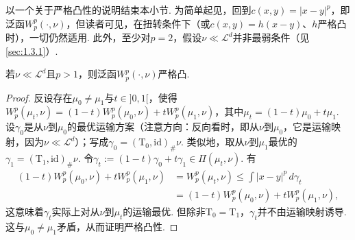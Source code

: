 以一个关于严格凸性的说明结束本小节. 为简单起见，回到$c(x,y)=|x-y|^p$，即泛函$W_p^p(\cdot,\nu)$，但读者可见，在扭转条件下（或$c(x,y)=h(x-y)$、$h$严格凸时），一切仍然适用. 此外，至少对$p=2$，假设$\nu\ll\mathscr L^d$并非最弱条件（见\autoref{sec:1.3.1}）.
\begin{proposition}\label{obj:7.19}
若$\nu\ll\mathscr L^d$且$p>1$，则泛函$W_p^p(\cdot,\nu)$严格凸.
\end{proposition}
\begin{proof}
反设存在$\mu_0\ne\mu_1$与$t\in]0,1[$，使得$W_p^p(\mu_t,\nu)=(1-t)W_p^p(\mu_0,\nu)+tW_p^p(\mu_1,\nu)$，其中$\mu_t=(1-t)\mu_0+t\mu_1$. 设$\gamma_0$是从$\nu$到$\mu_0$的最优运输方案（注意方向：反向看时，即从$\nu$到$\mu_0$，它是运输映射，因为$\nu\ll\mathscr L^d$）；写成$\gamma_0=(\mathrm T_0,\mathrm{id})_\#\nu$. 类似地，取从$\nu$到$\mu_1$最优的$\gamma_1=(\mathrm T_1,\mathrm{id})_\#\nu$. 令$\gamma_t:=(1-t)\gamma_0+t\gamma_1\in\Pi(\mu_t,\nu)$. 有
\[
\begin{aligned}
 (1-t)W_p^p(\mu_0,\nu)+tW_p^p(\mu_1,\nu)
 &=W_p^p(\mu_t,\nu)\leq\int|x-y|^p\,d\gamma_t\\
 &=(1-t)W_p^p(\mu_0,\nu)+tW_p^p(\mu_1,\nu),
\end{aligned}
\]
这意味着$\gamma_t$实际上对从$\nu$到$\mu_t$的运输最优. 但除非$\mathrm T_0=\mathrm T_1$，$\gamma_t$并不由运输映射诱导. 这与$\mu_0\ne\mu_1$矛盾，从而证明严格凸性.
\end{proof}

